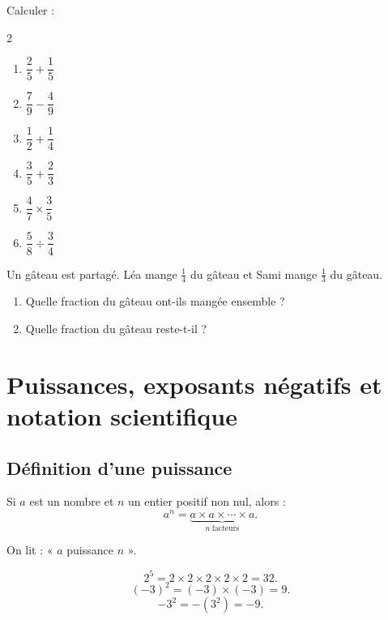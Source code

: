 \documentclass[11pt,a4paper]{article}
\newcounter{exercice}
\begin{document}
\begin{exercice}
Calculer :
\begin{multicols}{2}
\begin{enumerate}[label=\alph*)]
  \item $\dfrac{2}{5}+\dfrac{1}{5}$
  \item $\dfrac{7}{9}-\dfrac{4}{9}$
  \item $\dfrac{1}{2}+\dfrac{1}{4}$
  \item $\dfrac{3}{5}+\dfrac{2}{3}$
  \item $\dfrac{4}{7}\times\dfrac{3}{5}$
  \item $\dfrac{5}{8}\div\dfrac{3}{4}$
\end{enumerate}
\end{multicols}
\end{exercice}

\begin{exercice}[Problème]
Un gâteau est partagé. Léa mange $\frac{1}{4}$ du gâteau et Sami mange $\frac{1}{3}$ du gâteau.
\begin{enumerate}
  \item Quelle fraction du gâteau ont-ils mangée ensemble ?
  \item Quelle fraction du gâteau reste-t-il ?
\end{enumerate}
\end{exercice}

\newpage

\section{Puissances, exposants négatifs et notation scientifique}

\subsection{Définition d'une puissance}

\begin{definitionbox}
Si $a$ est un nombre et $n$ un entier positif non nul, alors :
\[
a^n=\underbrace{a\times a\times \cdots \times a}_{n\ \text{facteurs}}.
\]

On lit : « $a$ puissance $n$ ».
\end{definitionbox}

\begin{exemple}
\[
2^5=2\times2\times2\times2\times2=32.
\]
\[
(-3)^2=(-3)\times(-3)=9.
\]
\[
-3^2=-(3^2)=-9.
\]
\end{exemple}
\end{document}
